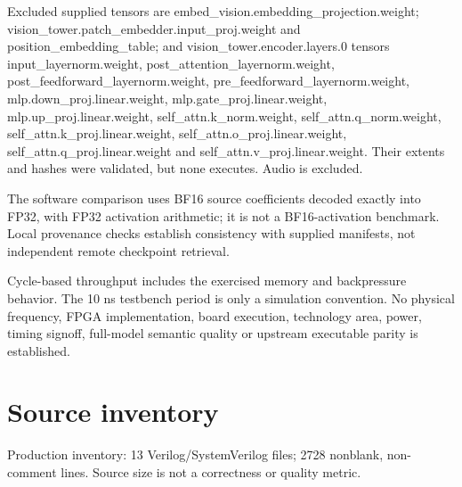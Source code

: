 \documentclass[11pt,a4paper]{article}
\begin{document}
Excluded supplied tensors are embed\_\allowbreak{}vision.embedding\_\allowbreak{}projection.weight; vision\_\allowbreak{}tower.patch\_\allowbreak{}embedder.input\_\allowbreak{}proj.weight and position\_\allowbreak{}embedding\_\allowbreak{}table; and vision\_\allowbreak{}tower.encoder.layers.0 tensors input\_\allowbreak{}layernorm.weight,\allowbreak{} post\_\allowbreak{}attention\_\allowbreak{}layernorm.weight,\allowbreak{} post\_\allowbreak{}feedforward\_\allowbreak{}layernorm.weight,\allowbreak{} pre\_\allowbreak{}feedforward\_\allowbreak{}layernorm.weight,\allowbreak{} mlp.down\_\allowbreak{}proj.linear.weight,\allowbreak{} mlp.gate\_\allowbreak{}proj.linear.weight,\allowbreak{} mlp.up\_\allowbreak{}proj.linear.weight,\allowbreak{} self\_\allowbreak{}attn.k\_\allowbreak{}norm.weight,\allowbreak{} self\_\allowbreak{}attn.q\_\allowbreak{}norm.weight,\allowbreak{} self\_\allowbreak{}attn.k\_\allowbreak{}proj.linear.weight,\allowbreak{} self\_\allowbreak{}attn.o\_\allowbreak{}proj.linear.weight,\allowbreak{} self\_\allowbreak{}attn.q\_\allowbreak{}proj.linear.weight and self\_\allowbreak{}attn.v\_\allowbreak{}proj.linear.weight. Their extents and hashes were validated,\allowbreak{} but none executes. Audio is excluded.


The software comparison uses BF16 source coefficients decoded exactly into FP32,\allowbreak{} with FP32 activation arithmetic; it is not a BF16-activation benchmark. Local provenance checks establish consistency with supplied manifests,\allowbreak{} not independent remote checkpoint retrieval.


Cycle-based throughput includes the exercised memory and backpressure behavior. The 10 ns testbench period is only a simulation convention. No physical frequency,\allowbreak{} FPGA implementation,\allowbreak{} board execution,\allowbreak{} technology area,\allowbreak{} power,\allowbreak{} timing signoff,\allowbreak{} full-model semantic quality or upstream executable parity is established.


\appendix\section{Source inventory}

Production inventory: 13 Verilog/\allowbreak{}SystemVerilog files; 2728 nonblank,\allowbreak{} non-comment lines. Source size is not a correctness or quality metric.
\end{document}
